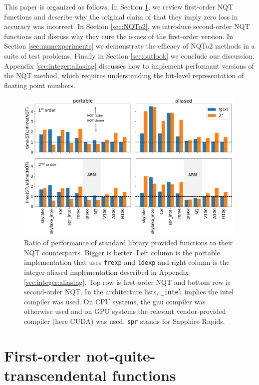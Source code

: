 \documentclass[linenumbers,twocolumn]{aastex631}
\newcommand{\mynote}[3]{
  \textcolor{#2}{\fbox{\bfseries\sffamily\scriptsize#1}}
    {\small$\blacktriangleright$\textsf{\emph{#3}}$\blacktriangleleft$}
}
\newcommand{\jf}[1]{\mynote{JF}{green}{#1}}
\newcommand{\jmm}[1]{\mynote{JMM}{blue}{#1}}
\begin{document}
This paper is organized as follows. In Section \ref{sec:NQTo1}, we review first-order NQT functions and describe why the original claim of \citet{NQTo1} that they imply zero loss in accuracy was incorrect. In Section \ref{sec:NQTo2}, we introduce second-order NQT functions and discuss why they cure the issues of the first-order version. In Section \ref{sec:numexperiments} we demonstrate the efficacy of NQTo2 methods in a suite of test problems. Finally in Section \ref{sec:outlook} we conclude our discussion. Appendix \ref{sec:integer:aliasing} discusses how to implement performant versions of the NQT method, which requires understanding the bit-level representation of floating point numbers.

\begin{figure}[tb]
    \centering
    \includegraphics[width=0.99\textwidth]{figures/nqt_speedups.pdf}
    \caption{Ratio of performance of standard library provided functions to their NQT counterparts. Bigger is better. Left column is the portable implementation that uses {\tt frexp} and {\tt ldexp} and right column is the integer aliased implementation described in Appendix \ref{sec:integer:aliasing}. Top row is first-order NQT and bottom row is second-order NQT. In the architecture lists, {\tt \_intel} implies the intel compiler was used. On CPU systems, the gnu compiler was otherwise used and on GPU systems the relevant vendor-provided compiler (here CUDA) was used. {\tt spr} stands for Sapphire Rapids.}
    \label{fig:NQT:comp}
\end{figure}

\section{First-order not-quite-transcendental functions}
\label{sec:NQTo1}
\end{document}
